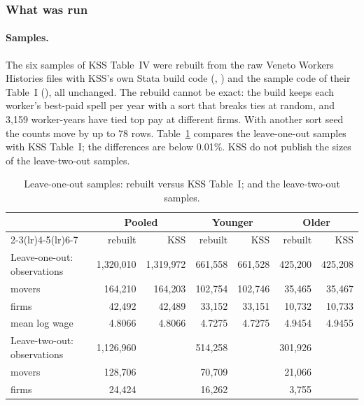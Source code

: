 
\subsubsection{What was run}\label{kss:sec:emp-setup}

\paragraph{Samples.} The six samples of KSS Table~IV were rebuilt from the raw Veneto Workers Histories
files with KSS's own Stata build code (, ) and the sample code of their
Table~I (), all unchanged. The rebuild cannot be exact: the build keeps each worker's
best-paid spell per year with a sort that breaks ties at random, and 3{,}159 worker-years have tied top
pay at different firms. With another sort seed the counts move by up to 78 rows. Table~\ref{kss:tab:emp-n}
compares the leave-one-out samples with KSS Table~I; the differences are below 0.01\%. KSS do not
publish the sizes of the leave-two-out samples.

\begin{table}[ht]
\centering\footnotesize\setlength{\tabcolsep}{2.5pt}
\caption{Leave-one-out samples: rebuilt versus KSS Table~I; and the leave-two-out samples.}\label{kss:tab:emp-n}
\begin{tabular}{@{}lrrrrrr@{}}
\toprule
 & \multicolumn{2}{c}{Pooled} & \multicolumn{2}{c}{Younger} & \multicolumn{2}{c}{Older}\\
\cmidrule(lr){2-3}\cmidrule(lr){4-5}\cmidrule(lr){6-7}
 & rebuilt & KSS & rebuilt & KSS & rebuilt & KSS\\
\midrule
Leave-one-out: observations & 1{,}320{,}010 & 1{,}319{,}972 & 661{,}558 & 661{,}528 & 425{,}200 & 425{,}208\\
\quad movers & 164{,}210 & 164{,}203 & 102{,}754 & 102{,}746 & 35{,}465 & 35{,}467\\
\quad firms & 42{,}492 & 42{,}489 & 33{,}152 & 33{,}151 & 10{,}732 & 10{,}733\\
\quad mean log wage & 4.8066 & 4.8066 & 4.7275 & 4.7275 & 4.9454 & 4.9455\\
Leave-two-out: observations & 1{,}126{,}960 & & 514{,}258 & & 301{,}926 & \\
\quad movers & 128{,}706 & & 70{,}709 & & 21{,}066 & \\
\quad firms & 24{,}424 & & 16{,}262 & & 3{,}755 & \\
\bottomrule
\end{tabular}
\end{table}

